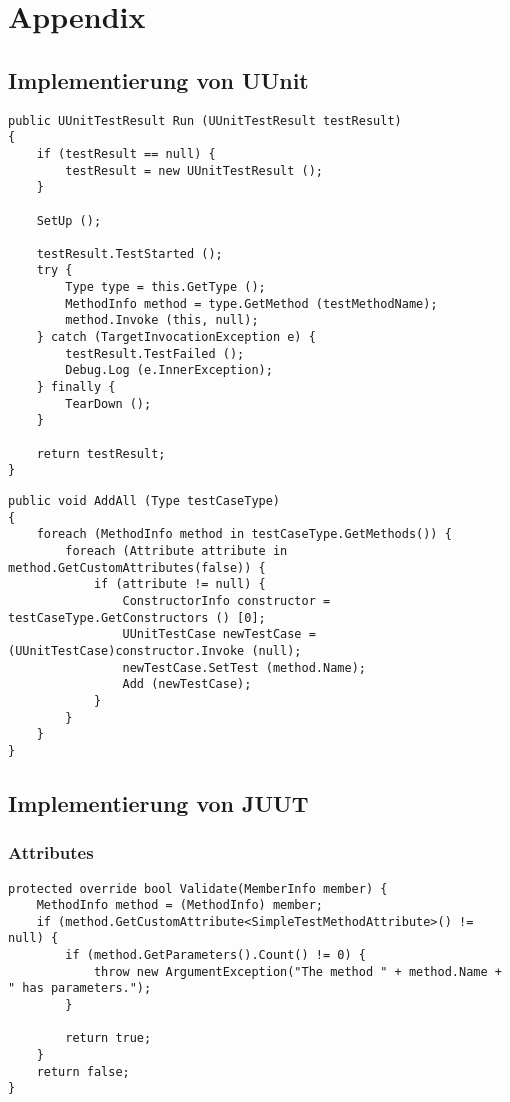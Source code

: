 \chapter{Appendix}

\section{Implementierung von UUnit}

\begin{lstlisting}[caption={[Quellcode der \textit{Run}-Methode von \textit{UUnitTestCase}]Quellcode der \textit{Run}-Methode von \textit{UUnitTestCase}}, label=code:UUnitTestCase_Run]
public UUnitTestResult Run (UUnitTestResult testResult)
{
	if (testResult == null) {
		testResult = new UUnitTestResult ();
	}
	
	SetUp ();
	
	testResult.TestStarted ();
	try {
		Type type = this.GetType ();
		MethodInfo method = type.GetMethod (testMethodName);
		method.Invoke (this, null);
	} catch (TargetInvocationException e) {
		testResult.TestFailed ();
		Debug.Log (e.InnerException);
	} finally {
		TearDown ();
	}
	
	return testResult;
}
\end{lstlisting}
\clearpage

\begin{lstlisting}[caption={[Quellcode der \textit{AddAll}-Methode von \textit{UUnitTestSuite}]Quellcode der \textit{AddAll}-Methode von \textit{UUnitTestSuite}}, label=code:UUnitTestSuite_AddAll]
public void AddAll (Type testCaseType)
{
	foreach (MethodInfo method in testCaseType.GetMethods()) {
		foreach (Attribute attribute in method.GetCustomAttributes(false)) {
			if (attribute != null) {
				ConstructorInfo constructor = testCaseType.GetConstructors () [0];
				UUnitTestCase newTestCase = (UUnitTestCase)constructor.Invoke (null);
				newTestCase.SetTest (method.Name);
				Add (newTestCase);
			}
		}
	}
}
\end{lstlisting}
\clearpage

\section{Implementierung von JUUT}

\subsection{Attributes}

\begin{lstlisting}[caption={[Quellcode der \textit{Validate}-Methode von \textit{SimpleTestMethodAttribute}]Quellcode der \textit{Validate}-Methode von \textit{SimpleTestMethodAttribute}}, label=code:SimpleTestMethodAttribute_Validate]
protected override bool Validate(MemberInfo member) {
    MethodInfo method = (MethodInfo) member;
    if (method.GetCustomAttribute<SimpleTestMethodAttribute>() != null) {
        if (method.GetParameters().Count() != 0) {
            throw new ArgumentException("The method " + method.Name + " has parameters.");
        }

        return true;
    }
    return false;
}
\end{lstlisting}

